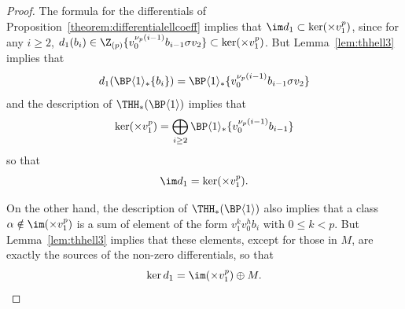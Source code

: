 \begin{proof}
  The formula for the differentials of Proposition~\ref{theorem:differentialellcoeff} implies that $\im d_1 \subset \ker (\times v_1^p)$, since for any $i \geq 2$, $d_1(b_i) \in \Z_{(p)}\{ v_0^{\nu_p(i-1)} b_{i-1} \sigma v_2 \} \subset \ker (\times v_1^p)$. But Lemma~\ref{lem:thhell3} implies that
  \begin{equation}
    d_1(\BP\langle 1\rangle_*\{ b_i \} ) = \BP\langle 1\rangle_* \{ v_0^{\nu_p(i-1)} b_{i-1} \sigma v_2 \}
  \end{equation}
  and the description of $\THH_*(\BP\langle 1\rangle)$ implies that
  \begin{equation}
    \ker (\times v_1^p) = \bigoplus_{i \geq 2} \BP\langle 1\rangle_* \{ v_0^{\nu_p(i-1)} b_{i-1} \}
  \end{equation}
  so that
  \begin{equation}
    \im d_1 = \ker (\times v_1^p).
  \end{equation}

  On the other hand, the description of $\THH_*(\BP\langle 1\rangle)$ also implies that a class $\alpha \notin \im (\times v_1^p)$ is a sum of element of the form $v_1^k v_0^h b_i$ with $0 \leq k < p$. 
  But Lemma~\ref{lem:thhell3} implies that these elements, except for those in $M$, are exactly the sources of the non-zero differentials, so that
  \begin{equation}
    \ker d_1 = \im (\times v_1^p) \oplus M.
  \end{equation}
\end{proof}
